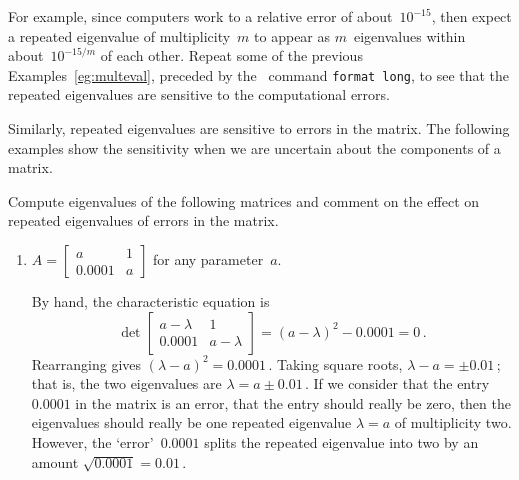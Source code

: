 For example, since computers work to a relative error of about~\(10^{-15}\), then expect a repeated eigenvalue of multiplicity~\(m\) to appear as \(m\)~eigenvalues within about~\(10^{-15/m}\) of each other.
Repeat some of the previous Examples~\ref{eg:multeval}, preceded by the \script\ command \verb|format long|, to see that the repeated eigenvalues are sensitive to the computational errors.

Similarly, repeated eigenvalues are sensitive to errors in the matrix. 
The following examples show the sensitivity when we are uncertain about the components of a matrix. 


\begin{example} \label{eg:}
Compute eigenvalues of the following matrices and comment on the effect on repeated eigenvalues of errors in the matrix.
\begin{enumerate}
\item \(A=\begin{bmatrix} a&1\\0.0001&a \end{bmatrix}\) for any parameter~\(a\).
\begin{solution} 
By hand, the characteristic equation is
\begin{equation*}
\det\begin{bmatrix} a-\lambda&1\\0.0001&a-\lambda \end{bmatrix}
=(a-\lambda)^2-0.0001=0\,.
\end{equation*}
Rearranging gives \((\lambda-a)^2=0.0001\)\,.
Taking square roots, \(\lambda-a=\pm0.01\)\,; that is, the two eigenvalues are \(\lambda=a\pm0.01\)\,.
If we consider that the entry~\(0.0001\) in the matrix is an error, that the entry should really be zero, then the eigenvalues should really be one repeated eigenvalue \(\lambda=a\) of multiplicity two.
However, the `error'~\(0.0001\) splits the repeated eigenvalue into two by an amount \(\sqrt{0.0001}=0.01\)\,.
\end{solution}



\end{enumerate}
\end{example}
